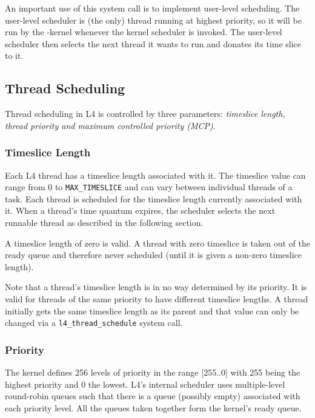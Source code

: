 An important use of this system call is to implement user-level
scheduling. The user-level scheduler is (the only) thread running at
highest priority, so it will be run by the \micro-kernel whenever the
kernel scheduler is invoked. The user-level scheduler then selects the
next thread it wants to run and donates its time slice to it.


\subsection{Thread Scheduling}


Thread scheduling in L4 is controlled by three parameters:
\emph{timeslice length, thread priority and maximum controlled
  priority (MCP)}.

\subsubsection{Timeslice Length}

Each L4 thread has a timeslice length associated with it.  The timeslice value
can range from 0  to {\footnotesize\verb+MAX_TIMESLICE+} and can  vary between
individual threads  of  a task. Each  thread  is scheduled for  the  timeslice
length currently associated with it. When a thread's time quantum expires, the
scheduler  selects the next runnable  thread  as  described  in the  following
section.

A timeslice length of zero is valid.  A thread with zero timeslice is
taken out of the ready queue and therefore never scheduled (until it
is given a non-zero timeslice length).

Note that a thread's timeslice length is in no way determined by its
priority. It is valid for threads of the same priority to have
different timeslice lengths. A thread initially gets the same
timeslice length as its parent and that value can only be changed via
a {\footnotesize\verb+l4_thread_schedule+} system call.

\subsubsection{Priority}

The kernel defines 256 levels of priority in the range
[255..0] with 255 being the highest priority and 0 the lowest. L4's
internal scheduler uses multiple-level round-robin queues such that
there is a queue (possibly empty) associated with each priority level.
All the queues taken together form the kernel's ready queue.

